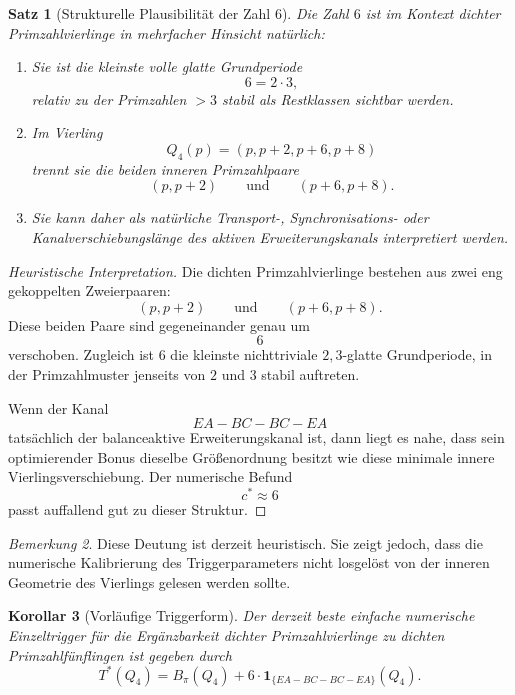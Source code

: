 \documentclass[11pt,a4paper]{article}
\newtheorem{satz}{Satz}
\newtheorem{korollar}[satz]{Korollar}
\theoremstyle{definition}
\theoremstyle{remark}
\newtheorem{bemerkung}[satz]{Bemerkung}
\begin{document}
	\begin{satz}[Strukturelle Plausibilität der Zahl \(6\)]
		\label{satz:strukturelle_plausibilitaet_6}
		Die Zahl \(6\) ist im Kontext dichter Primzahlvierlinge in mehrfacher Hinsicht natürlich:
		
		\begin{enumerate}
			\item Sie ist die kleinste volle glatte Grundperiode
			\[
			6=2\cdot 3,
			\]
			relativ zu der Primzahlen \(>3\) stabil als Restklassen sichtbar werden.
			
			\item Im Vierling
			\[
			Q_4(p)=(p,p+2,p+6,p+8)
			\]
			trennt sie die beiden inneren Primzahlpaare
			\[
			(p,p+2)
			\qquad\text{und}\qquad
			(p+6,p+8).
			\]
			
			\item Sie kann daher als natürliche Transport-, Synchronisations- oder
			Kanalverschiebungslänge des aktiven Erweiterungskanals interpretiert werden.
		\end{enumerate}
	\end{satz}
	
	\begin{proof}[Heuristische Interpretation]
		Die dichten Primzahlvierlinge bestehen aus zwei eng gekoppelten Zweierpaaren:
		\[
		(p,p+2)
		\qquad\text{und}\qquad
		(p+6,p+8).
		\]
		Diese beiden Paare sind gegeneinander genau um
		\[
		6
		\]
		verschoben. Zugleich ist \(6\) die kleinste nichttriviale \(2,3\)-glatte Grundperiode, in
		der Primzahlmuster jenseits von \(2\) und \(3\) stabil auftreten.
		
		Wenn der Kanal
		\[
		EA-BC-BC-EA
		\]
		tatsächlich der balanceaktive Erweiterungskanal ist, dann liegt es nahe, dass sein
		optimierender Bonus dieselbe Größenordnung besitzt wie diese minimale innere
		Vierlingsverschiebung. Der numerische Befund
		\[
		c^*\approx 6
		\]
		passt auffallend gut zu dieser Struktur.
	\end{proof}
	
	\begin{bemerkung}
		Diese Deutung ist derzeit heuristisch. Sie zeigt jedoch, dass die numerische Kalibrierung
		des Triggerparameters nicht losgelöst von der inneren Geometrie des Vierlings gelesen
		werden sollte.
	\end{bemerkung}
	
	\begin{korollar}[Vorläufige Triggerform]
		\label{kor:vorlaeufige_triggerform}
		Der derzeit beste einfache numerische Einzeltrigger für die Ergänzbarkeit dichter
		Primzahlvierlinge zu dichten Primzahlfünflingen ist gegeben durch
		\[
		\boxed{
			T^*(Q_4)=B_\pi(Q_4)+6\cdot \mathbf 1_{\{EA-BC-BC-EA\}}(Q_4).
		}
		\]
	\end{korollar}
	
\end{document}
